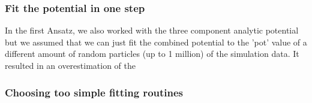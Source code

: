\subsubsection{Fit the potential in one step}
In the first Ansatz, we also worked with the three component analytic potential but we assumed that we can just fit the combined potential to the 'pot' value of a different amount of random particles (up to 1 million) of the simulation data. It resulted in an overestimation of the 



\subsubsection{Choosing too simple fitting routines}




